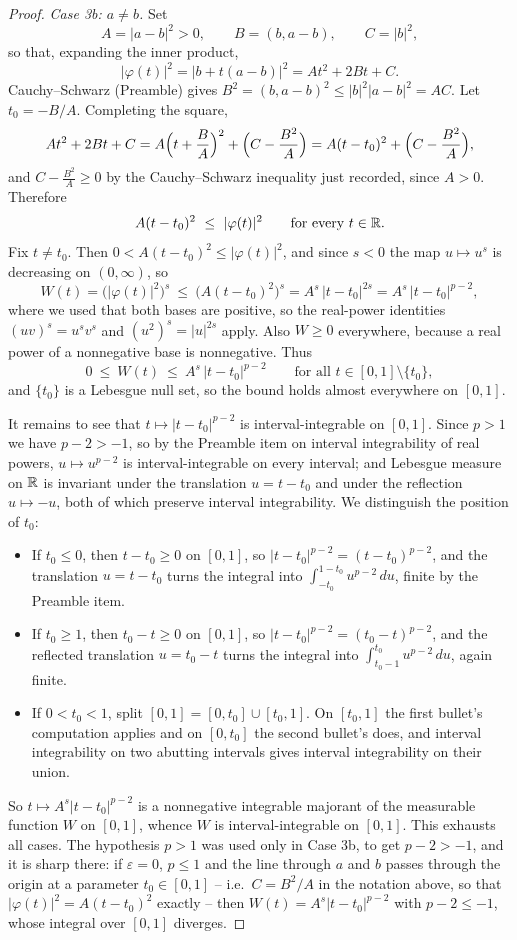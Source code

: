\begin{proof}
\emph{Case 3b: $a\ne b$.}  Set
\[
A=|a-b|^2>0,\qquad B=(b,a-b),\qquad C=|b|^2 ,
\]
so that, expanding the inner product,
\[
|\varphi(t)|^2=|b+t(a-b)|^2=At^2+2Bt+C .
\]
Cauchy--Schwarz (Preamble) gives $B^2=(b,a-b)^2\le|b|^2|a-b|^2=AC$.  Let
$t_0=-B/A$.  Completing the square,
\[
At^2+2Bt+C=A\Bigl(t+\frac BA\Bigr)^2+\Bigl(C-\frac{B^2}A\Bigr)
=A(t-t_0)^2+\Bigl(C-\frac{B^2}A\Bigr),
\]
and $C-\frac{B^2}A\ge0$ by the Cauchy--Schwarz inequality just recorded, since
$A>0$.  Therefore
\[
A(t-t_0)^2\ \le\ |\varphi(t)|^2\qquad\text{for every }t\in\R .
\]
Fix $t\ne t_0$.  Then $0<A(t-t_0)^2\le|\varphi(t)|^2$, and since $s<0$ the map
$u\mapsto u^{s}$ is decreasing on $(0,\infty)$, so
\[
W(t)=\bigl(|\varphi(t)|^2\bigr)^{s}\ \le\ \bigl(A(t-t_0)^2\bigr)^{s}
=A^{s}\,|t-t_0|^{2s}=A^{s}\,|t-t_0|^{p-2},
\]
where we used that both bases are positive, so the real-power identities
$(uv)^{s}=u^{s}v^{s}$ and $(u^2)^{s}=|u|^{2s}$ apply.  Also $W\ge0$
everywhere, because a real power of a nonnegative base is nonnegative.  Thus
\[
0\ \le\ W(t)\ \le\ A^{s}\,|t-t_0|^{p-2}
\qquad\text{for all }t\in[0,1]\setminus\{t_0\},
\]
and $\{t_0\}$ is a Lebesgue null set, so the bound holds almost everywhere on
$[0,1]$.

It remains to see that $t\mapsto|t-t_0|^{p-2}$ is interval-integrable on
$[0,1]$.  Since $p>1$ we have $p-2>-1$, so by the Preamble item on
interval integrability of real powers, $u\mapsto u^{p-2}$ is
interval-integrable on every interval; and Lebesgue measure on $\mathbb{R}$ is
invariant under the translation $u=t-t_0$ and under the reflection
$u\mapsto-u$, both of which preserve interval integrability.  We distinguish
the position of $t_0$:

\begin{itemize}
\item If $t_0\le0$, then $t-t_0\ge0$ on $[0,1]$, so
  $|t-t_0|^{p-2}=(t-t_0)^{p-2}$, and the translation $u=t-t_0$ turns the
  integral into $\int_{-t_0}^{1-t_0}u^{p-2}\,du$, finite by the Preamble item.
\item If $t_0\ge1$, then $t_0-t\ge0$ on $[0,1]$, so
  $|t-t_0|^{p-2}=(t_0-t)^{p-2}$, and the reflected translation $u=t_0-t$ turns
  the integral into $\int_{t_0-1}^{t_0}u^{p-2}\,du$, again finite.
\item If $0<t_0<1$, split $[0,1]=[0,t_0]\cup[t_0,1]$.  On $[t_0,1]$ the first
  bullet's computation applies and on $[0,t_0]$ the second bullet's does, and
  interval integrability on two abutting intervals gives interval
  integrability on their union.
\end{itemize}

So $t\mapsto A^{s}|t-t_0|^{p-2}$ is a nonnegative integrable majorant of the
measurable function $W$ on $[0,1]$, whence $W$ is interval-integrable on
$[0,1]$.  This exhausts all cases.  The hypothesis $p>1$ was used only in
Case 3b, to get $p-2>-1$, and it is sharp there: if $\varepsilon=0$, $p\le1$
and the line through $a$ and $b$ passes through the origin at a parameter
$t_0\in[0,1]$ -- i.e.\ $C=B^2/A$ in the notation above, so that
$|\varphi(t)|^2=A(t-t_0)^2$ exactly -- then
$W(t)=A^{s}|t-t_0|^{p-2}$ with $p-2\le-1$, whose integral over $[0,1]$
diverges.
\end{proof}
